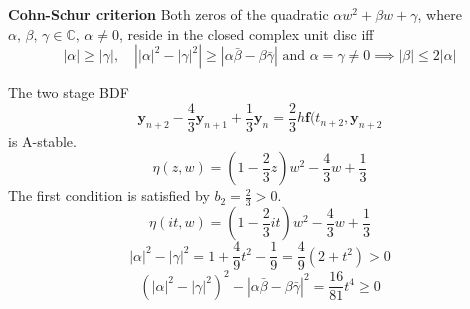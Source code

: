 \documentclass[letterpaper]{article}
\providecommand{\abs}[1]{\left\lvert#1\right\rvert}
\begin{document}
\begin{multicols}{2}
\textbf{Cohn-Schur criterion} Both zeros of the quadratic $\alpha w^2+\beta
w+\gamma$, where $\alpha,\,\beta,\,\gamma\in\mathbb{C},\,\alpha\neq 0$, reside
in the closed complex unit disc iff
\[
\abs{\alpha}\ge\abs{\gamma},\quad\abs{\abs{\alpha}^2-\abs{\gamma}^2}\ge\abs{\alpha\bar\beta-\beta\bar\gamma}
\text{ and }\alpha=\gamma\neq0\implies\abs{\beta}\le2\abs{\alpha}
\]

The two stage BDF
\[
\mathbf{y}_{n+2}-\frac{4}{3}\mathbf{y}_{n+1}+\frac{1}{3}\mathbf{y}_n=\frac{2}{3}h\mathbf{f}(t_{n+2},\mathbf{y}_{n+2}
\]
is A-stable.
\[
\eta(z,w)=\left(1-\frac{2}{3}z\right)w^2-\frac{4}{3}w+\frac{1}{3}
\]
The first condition is satisfied by $b_2=\frac{2}{3}>0$.
\[
\eta(it,w)=\left(1-\frac{2}{3}it\right)w^2-\frac{4}{3}w+\frac{1}{3}
\]
\[
\abs{\alpha}^2-\abs{\gamma}^2=1+\frac{4}{9}t^2-\frac{1}{9}=\frac{4}{9}(2+t^2)>0
\]
\[
\left(\abs{\alpha}^2-\abs{\gamma}^2\right)^2-\abs{\alpha\bar\beta-\beta\bar\gamma}^2=\frac{16}{81}t^4\ge0
\]
\end{multicols}
\end{document}

